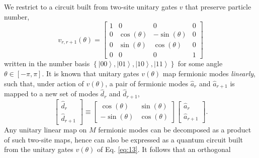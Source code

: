 \documentclass[aps,prl,twocolumn,showpacs,superscriptaddress,floatfix,10pt]{revtex4-1}
\begin{document}
We restrict to a circuit built from two-site unitary gates $v$ that preserve
particle number,
\begin{equation}
{v_{r,r + 1}}\left( \theta  \right) = \left[ {\begin{array}{*{20}{c}}
  1&0&0&0 \\ 
  0&{\cos \left( \theta  \right)}&{ - \sin \left( \theta  \right)}&0 \\ 
  0&{\sin \left( \theta  \right)}&{\cos \left( \theta  \right)}&0 \\ 
  0&0&0&1 
\end{array}} \right] \label{eq:13}
\end{equation}
written in the number basis 
$\left\{ {\left| {00} \right\rangle ,\left| {01} \right\rangle
,\left| {10} \right\rangle ,\left| {11} \right\rangle } \right\}$ 
for some angle $\theta \in [-\pi,\pi]$.  It is known that unitary gates $v(\theta)$ map fermionic modes \emph{linearly}, such that, under action of
$v(\theta)$, a pair of fermionic modes $\hat a_r$ and $\hat a_{r+1}$ is mapped to a
new set of modes $\hat d_r$ and $\hat d_{r+1}$, 
\begin{equation}
\left[ {\begin{array}{*{20}{c}}
  {{{\hat d}_r}} \\ 
  {{{\hat d}_{r + 1}}} 
\end{array}} \right] \equiv \left[ {\begin{array}{*{20}{c}}
  {\cos \left( \theta  \right)}&{\sin \left( \theta  \right)} \\ 
  { - \sin \left( \theta  \right)}&{\cos \left( \theta  \right)} 
\end{array}} \right]\left[ {\begin{array}{*{20}{c}}
  {{{\hat a}_r}} \\ 
  {{{\hat a}_{r + 1}}} 
\end{array}} \right]. \label{eq:14}
\end{equation}
Any unitary linear map on $M$ fermionic modes can be decomposed as a product of such
two-site maps, hence can also be expressed as a quantum circuit built from the
unitary gates $v(\theta)$ of Eq. \ref{eq:13}. It follows that an orthogonal
\end{document}

